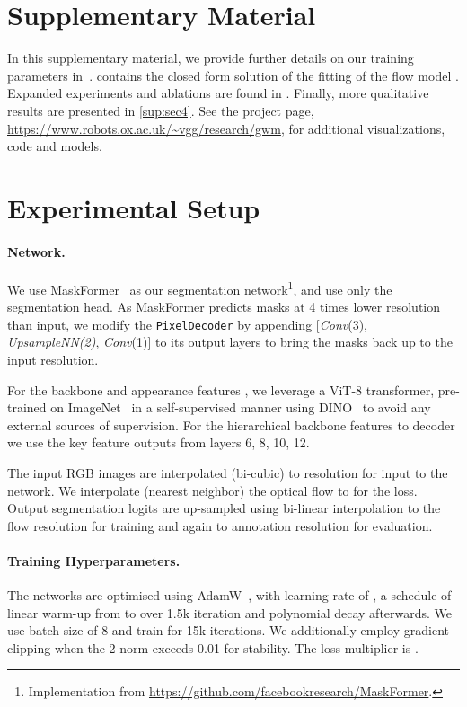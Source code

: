 \noindent
\section*{Supplementary Material}
In this supplementary material, we provide further details on our training parameters in~.  contains the closed form solution of the fitting of the flow model . Expanded experiments and ablations are found in . Finally, more qualitative results are presented in \cref{sup:sec4}. See the project page, \url{https://www.robots.ox.ac.uk/~vgg/research/gwm}, for additional visualizations, code and models.



\section{Experimental Setup}\label{sup:sec1}
\paragraph{Network.} We use MaskFormer~\cite{cheng2021maskformer} as our segmentation network\footnote{Implementation from  \url{https://github.com/facebookresearch/MaskFormer}.}, and use only the segmentation head. As MaskFormer predicts masks at 4 times lower resolution than input, we modify the \texttt{PixelDecoder} by appending [\textit{Conv}(3), \textit{UpsampleNN(2)}, \textit{Conv}(1)] to its output layers to bring the masks back up to the input resolution.

For the backbone and appearance features , we leverage a ViT-8 transformer, 
pre-trained on ImageNet~\cite{russakovsky2015imagenet} in a self-supervised manner using DINO~\cite{Caron_2021_ICCV}
to avoid any external sources of supervision. For the hierarchical backbone features to decoder we use the key feature outputs from layers 6, 8, 10, 12.

The input RGB images are interpolated (bi-cubic) to  resolution for input to the network. We interpolate (nearest neighbor) the optical flow to  for the loss.
Output segmentation logits are up-sampled using bi-linear interpolation to the flow resolution for training and again to annotation resolution for evaluation.


\paragraph{Training Hyperparameters.}\label{sup:hparam}
The networks are optimised using AdamW~\cite{loshchilov2018decoupled}, 
with learning rate of , a schedule of linear warm-up from  to  over 1.5k iteration and polynomial decay afterwards. We use batch size of 8 and train for 15k iterations. We additionally employ gradient clipping when the 2-norm exceeds 0.01 for stability. The loss multiplier is . 

